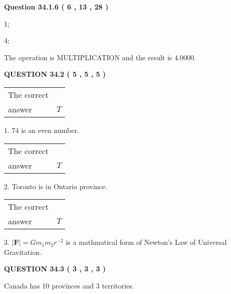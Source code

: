 \documentclass[12pt]{article}
\begin{document}
{\textbf{\Large{Question
34.1.6 
 (           6 ,          13 ,          28 )
}}}
  
  
 
 
\noindent{}

1;
 
4;
 
The operation is  %
MULTIPLICATION and the result is
$ %
4.0000$.
 
 
 
  
\vspace{0.2in}
  
{\textbf{\Large{QUESTION
34.2 
 (           5 ,           5 ,           5 )
}}}
  
  
 
 
\noindent{}

 
\noindent\begin{tabular}{|l|l|}\hline The correct & \\
          answer &  %
$T$ \\ \hline \end{tabular}
1. $ %
74$ is an  %
even number.
 
\noindent\begin{tabular}{|l|l|}\hline The correct & \\
          answer &  %
$T$ \\ \hline \end{tabular}
2.  %
Toronto is in  %
Ontario province.
 
\noindent\begin{tabular}{|l|l|}\hline The correct & \\
          answer &  %
$T$ \\ \hline \end{tabular}
3.  %
$\left| \mathbf{F}\right| =Gm_1m_2r^{-2}$ is a mathmatical form of  %
Newton's Law of Universal Gravitation.
 
 
 
  
\vspace{0.2in}
  
{\textbf{\Large{QUESTION
34.3 
 (           3 ,           3 ,           3 )
}}}
  
  
 
 
\noindent{}
 
 
Canada has  %
10 provinces and  %
3 territories.
 
\end{document}
